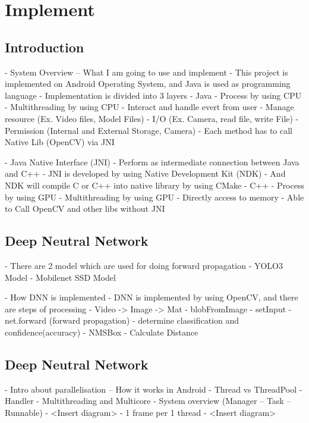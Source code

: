 \chapter{Implement}\label{implement}

    \section{Introduction}
        - System Overview – What I am going to use and implement
                - This project is implemented on Android Operating System, and Java is used as programming language
        - Implementation is divided into 3 layers
                - Java
                    - Process by using CPU
                        - Multithreading by using CPU
                    - Interact and handle evert from user
                    - Manage resource (Ex. Video files, Model Files)
                    - I/O (Ex. Camera, read file, write File)
                    - Permission (Internal and External Storage, Camera)
                    - Each method has to call Native Lib (OpenCV) via JNI

                - Java Native Interface (JNI)
                    - Perform as intermediate connection between Java and C++
                    - JNI is developed by using Native Development Kit (NDK)
                        - And NDK will compile C or C++ into native library by using CMake
                - C++
                    - Process by using GPU
                        - Multithreading by using GPU
                    - Directly access to memory
                    - Able to Call OpenCV and other libs without JNI

    \section{Deep Neutral Network}
        -	There are 2 model which are used for doing forward propagation
            - YOLO3 Model
            - Mobilenet SSD Model

        -	How DNN is implemented
            - DNN is implemented by using OpenCV, and there are steps of processing
                - Video -> Image -> Mat
                - blobFromImage
                - setInput
                - net.forward (forward propagation)
                - determine classification and confidence(accuracy)
                - NMSBox
                - Calculate Distance

    \section{Deep Neutral Network}
        -	Intro about parallelisation – How it works in Android
            - Thread vs ThreadPool
            - Handler
        -	Multithreading and Multicore
        -	System overview (Manager – Task – Runnable)
            - <Insert diagram>
        -	1 frame per 1 thread
            - <Insert diagram>

